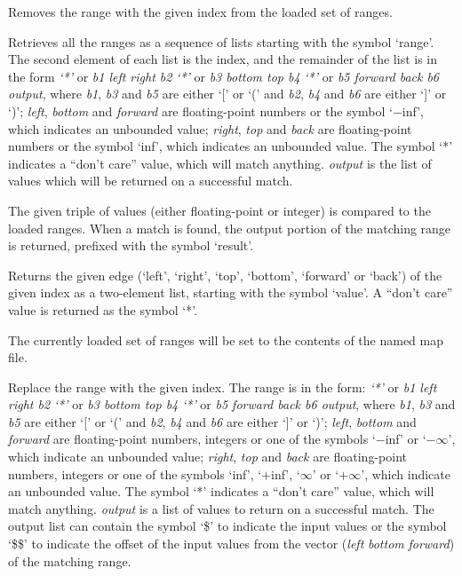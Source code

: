  Removes the range with the given index from the loaded set of ranges.

  Retrieves all the ranges as a sequence of lists starting with the symbol `range'.
  The second element of each list is the index, and the remainder of the list is in the form
  \emph{`*'} or \emph{b1 left right b2} \emph{`*'} or \emph{b3 bottom top b4} \emph{`*'} or \emph{b5 forward back b6 output}, where \emph{b1}, \emph{b3} and \emph{b5}
  are either `[' or `(' and \emph{b2}, \emph{b4} and \emph{b6} are either `]' or `)';
  \emph{left}, \emph{bottom} and \emph{forward} are floating-point numbers or the symbol `$-$inf',
  which indicates an unbounded value; \emph{right}, \emph{top} and \emph{back} are floating-point numbers or
  the symbol `inf', which indicates an unbounded value.
  The symbol `*' indicates a ``don't care'' value, which will match anything.
  \emph{output} is the list of values which will be returned on a successful match.

  The given triple of values (either floating-point or integer) is compared to the loaded ranges.
  When a match is found, the output portion of the matching range is returned, prefixed with the symbol
  `result'.
  
  Returns the given edge (`left', `right', `top', `bottom', `forward' or `back') of the given index as a
  two-element list, starting with the symbol `value'.
  A ``don't care'' value is returned as the symbol `*'.

  The currently loaded set of ranges will be set to the contents of the named map file.
  
  Replace the range with the given index.
  The range is in the form: \emph{`*'} or \emph{b1 left right b2} \emph{`*'} or \emph{b3 bottom top b4} \emph{`*'} or \emph{b5 forward back b6 output}, where
  \emph{b1}, \emph{b3} and \emph{b5} are either `[' or `(' and \emph{b2}, \emph{b4} and \emph{b6} are
  either `]' or `)';
  \emph{left}, \emph{bottom} and \emph{forward} are floating-point numbers, integers or one of the symbols `$-$inf' or
  `$-\infty$', which indicate an unbounded value;
  \emph{right}, \emph{top} and \emph{back} are floating-point numbers, integers or one of the symbols `inf', `$+$inf',
  `$\infty$' or `$+\infty$', which indicate an unbounded value.
  The symbol `*' indicates a ``don't care'' value, which will match anything.
  \emph{output} is a list of values to return on a successful match.
  The output list can contain the symbol `\$' to indicate the input values or the symbol `\$\$' to
  indicate the offset of the input values from the vector (\emph{left} \emph{bottom} \emph{forward}) of the
  matching range.
  
